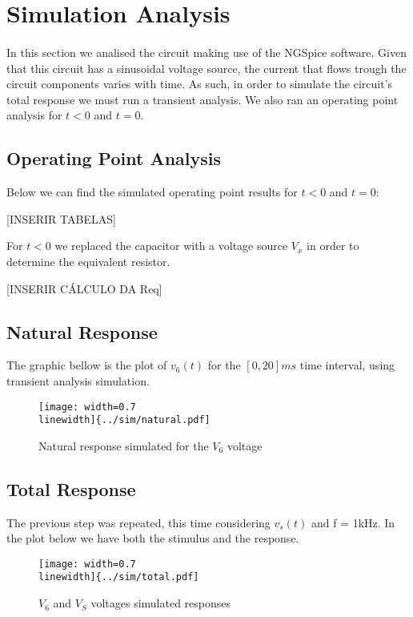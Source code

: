 \section{Simulation Analysis}
\label{sec:simulation}

\paragraph{} In this section we analised the circuit making use of the NGSpice software. Given that this circuit has a sinusoidal voltage source, the current that flows trough the circuit components varies with time.
As such, in order to simulate the circuit's total response we must run a transient analysis. We also ran an operating point analysis for $t < 0$ and $t = 0$.

\subsection{Operating Point Analysis}

Below we can find the simulated operating point results for  $t < 0$ and $t = 0$:

[INSERIR TABELAS]

For $t<0$ we replaced the capacitor with a voltage source $V_x$ in order to determine the equivalent resistor.

[INSERIR CÁLCULO DA Req]

\subsection{Natural Response}

The graphic bellow is the plot of $v_6(t)$ for the $[0, 20]ms$ time interval, using transient analysis simulation.

\begin{figure}[!h]
	\centering
	\texttt{[image: width=0.7\\linewidth]\{../sim/natural.pdf]}
	\caption{Natural response simulated for the $V_6$ voltage}
\end{figure}

\subsection{Total Response}

The previous step was repeated, this time considering $v_s(t)$ and f = 1kHz. In the plot below we have both the stimulus and the response.

\begin{figure}[!h]
	\centering
	\texttt{[image: width=0.7\\linewidth]\{../sim/total.pdf]}
	\caption{$V_6$ and $V_S$ voltages simulated responses}
\end{figure}



